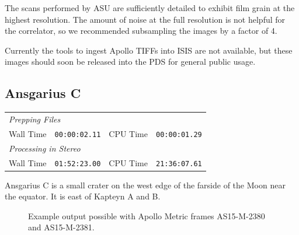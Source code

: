 The scans performed by ASU are sufficiently detailed to exhibit film
grain at the highest resolution.  The amount of noise at the full
resolution is not helpful for the correlator, so we recommended
subsampling the images by a factor of 4.

Currently the tools to ingest Apollo TIFFs into ISIS are not
available, but these images should soon be released into the PDS for
general public usage.

\subsection{Ansgarius C}

\begin{tabular}{ r c r c}
\multicolumn{3}{l}{ \emph{Prepping Files} } \\
Wall Time & \texttt{00:00:02.11} & CPU Time & \texttt{00:00:01.29} \\
\multicolumn{3}{l}{ \emph{Processing in Stereo} } \\
Wall Time & \texttt{01:52:23.00} & CPU Time & \texttt{21:36:07.61} \\
\end{tabular}

Ansgarius C is a small crater on the west edge of the farside of the
Moon near the equator. It is east of Kapteyn A and B.

\begin{figure}[h!]
\centering
  \hfil
\caption{Example output possible with Apollo Metric frames AS15-M-2380 and AS15-M-2381.}
\label{fig:metric_example}
\end{figure}

